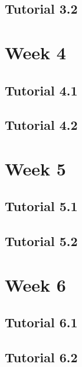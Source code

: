 \documentclass{article}
\begin{document}
\begin{multicols}{2}
\subsection{Tutorial 3.2}
\section{Week 4}
\subsection{Tutorial 4.1}
\subsection{Tutorial 4.2}
\section{Week 5}
\subsection{Tutorial 5.1}
\subsection{Tutorial 5.2}
\section{Week 6}
\subsection{Tutorial 6.1}
\subsection{Tutorial 6.2}
\end{multicols}
\end{document}

